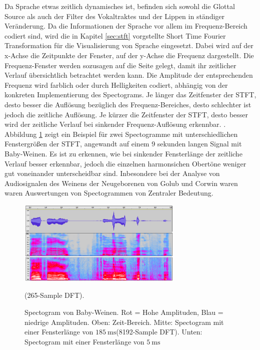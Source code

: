 Da Sprache etwas zeitlich dynamisches ist, befinden sich sowohl die Glottal Source als auch der Filter des Vokaltraktes und der Lippen in ständiger Veränderung. Da die Informationen der Sprache vor allem im Frequenz-Bereich codiert sind, wird die in Kapitel \ref{sec:stft} vorgstellte Short Time Fourier Transformation für die Visualisierung von Sprache eingesetzt. Dabei wird auf der x-Achse die Zeitpunkte der Fenster, auf der y-Achse die Frequenz dargestellt. Die Frequenz-Fenster werden sozusagen \glqq auf die Seite gelegt\grqq{}, damit ihr zeitlicher Verlauf übersichtlich betrachtet werden kann. Die Amplitude der entsprechenden Frequenz wird farblich oder durch Helligkeiten codiert, abhängig von der konkreten Implementierung des Spectograms. Je länger das Zeitfenster der STFT, desto besser die Auflösung bezüglich des Frequenz-Bereiches, desto schlechter ist jedoch  die zeitliche Auflösung. Je kürzer die Zeitfenster der STFT, desto besser wird der zeitliche Verlauf bei sinkender Frequenz-Auflösung erkennbar.\cite[S. 48 - 50]{sprachverarbeitung} \cite[Acoustic Representations of Speech]{speechAcoustics}. Abbildung \ref{img:formants} zeigt ein Beispiel für zwei Spectogramme mit unterschiedlichen Fenstergrößen der STFT, angewandt auf einem 9 sekunden langen Signal mit Baby-Weinen. Es ist zu erkennen, wie bei sinkender Fensterlänge der zeitliche Verlauf besser erkennbar, jedoch die einzelnen harmonsichen Obertöne weniger gut voneinander unterscheidbar sind. Inbesondere bei der Analyse von Audiosignalen des Weinens der Neugeborenen von Golub und Corwin waren \cite{cryModel} waren Auswertungen von Spectogrammen von Zentraler Bedeutung.

\begin{figure}[h]
	\centering
	\includegraphics[width=0.7\textwidth]{bilder/spectogram03.png}
	\caption{Spectogram von Baby-Weinen. Rot = Hohe Amplituden, Blau = niedrige Amplituden. Oben: Zeit-Bereich. Mitte: Spectogram mit einer Fensterlänge von $\SI{185}{\milli\second}$(8192-Sample DFT). Unten: Spectogram mit einer Fensterlänge von $\SI{5}{\milli\second}$} (265-Sample DFT).
	\label{img:formants}
\end{figure}	



